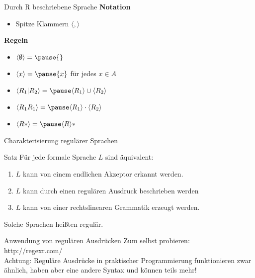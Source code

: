\begin{frame}{Durch R beschriebene Sprache}
	\textbf{Notation}\\
	\begin{itemize}
		\item Spitze Klammern $\langle , \rangle$
	\end{itemize}

	\pause
	
	\textbf{Regeln}\\
	\begin{itemize}
		\item $\langle \emptyset \rangle = \pause \{\}$ \pause
		\item $\langle x \rangle = \pause \{x\}$ für jedes $x \in A$ \pause
		\item $\langle R_1| R_2\rangle = \pause \langle R_1\rangle \cup \langle R_2\rangle$ \pause
		\item $\langle R_1 R_1 \rangle = \pause \langle R_1 \rangle \cdot \langle R_2 \rangle$ \pause
		\item $\langle R* \rangle = \pause \langle R \rangle *$
	\end{itemize}
\end{frame}

\begin{frame}{Charakterisierung regulärer Sprachen}
	\begin{block}{Satz}
		Für jede formale Sprache $L$ sind äquivalent:
		\begin{enumerate}
			\item $L$ kann von einem endlichen Akzeptor erkannt werden.
			\item $L$ kann durch einen regulären Ausdruck beschrieben werden
			\item $L$ kann von einer rechtslinearen Grammatik erzeugt werden.
		\end{enumerate}
		Solche Sprachen heißten regulär.
	\end{block}
\end{frame}

\begin{frame}{Anwendung von regulären Ausdrücken}
	\vfill \centering Zum selbst probieren:\\http://regexr.com/\\\vspace{.2cm}Achtung: Reguläre Ausdrücke in praktischer Programmierung funktionieren zwar ähnlich, haben aber eine andere Syntax und können teils mehr!\vfill
\end{frame}

